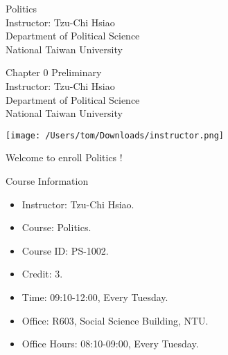 \documentclass{beamer}
\title{}
\author{}
\date{}
\begin{document}
\begin{frame}
\begin{center}
\Large{Politics} \\
\vspace{3em}
\normalsize{Instructor: Tzu-Chi Hsiao} \\
\vspace{3em}
\small{Department of Political Science} \\
\vspace{1em}
\small{National Taiwan University}
\end{center}
\end{frame}
\begin{frame}
\begin{center}
\Large{Chapter 0 Preliminary} \\
\vspace{3em}
\normalsize{Instructor: Tzu-Chi Hsiao} \\
\vspace{3em}
\small{Department of Political Science} \\
\vspace{1em}
\small{National Taiwan University} \\
\end{center}
\end{frame}
\begin{frame}{}
\begin{center}
\texttt{[image: /Users/tom/Downloads/instructor.png]}
\end{center}
\vspace{1em}
\begin{center}
\Large{Welcome to enroll Politics !} \\
\end{center}
\end{frame}
\begin{frame}{Course Information}
\begin{itemize}
\pause
\item Instructor: Tzu-Chi Hsiao.
\pause
\item Course: Politics.
\pause
\item Course ID: PS-1002.
\pause
\item Credit: 3.
\pause
\item Time: 09:10-12:00, Every Tuesday.
\pause
\item Office: R603, Social Science Building, NTU.
\pause
\item Office Hours: 08:10-09:00, Every Tuesday.
\end{itemize}
\end{frame}
\end{document}

